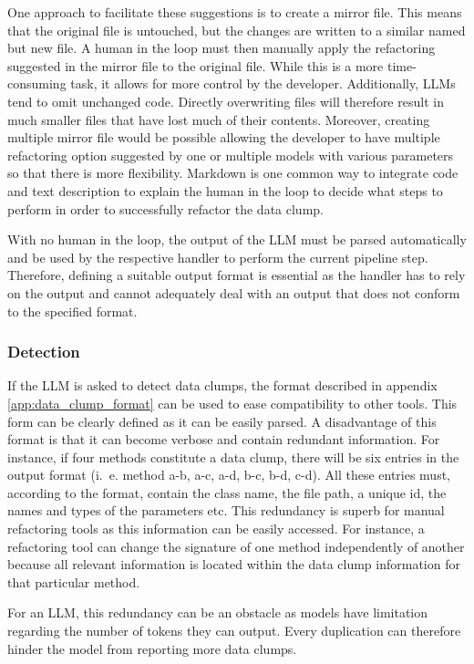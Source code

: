 One approach to facilitate these suggestions is to create a mirror file. This means that the original file is untouched, but the changes are written to a similar named but new file. A human in the loop must then manually apply the refactoring suggested in the mirror file to the original file. While this is a more time-consuming task, it allows for more control by the developer. Additionally, \acp{LLM} tend to omit unchanged code. Directly overwriting files will therefore result in much smaller files that have lost much of their contents. Moreover, creating multiple mirror file would be possible allowing the developer to have multiple refactoring option suggested by one or multiple models with various parameters so that there is more flexibility. 
Markdown is one common way to integrate code and text description to explain the human in the loop to decide what steps to perform in order to successfully refactor the data clump.  

\bigskip

With no human in the loop, the output of the \ac{LLM} must be parsed automatically and be used by the respective handler to perform the current pipeline step. Therefore, defining a suitable output  format  is essential as the handler has to rely on the output and cannot adequately deal with an output that does not conform to the specified format. 
\subsubsection{Detection}
If the \ac{LLM} is asked to detect data clumps, the format described in appendix \ref{app:data_clump_format} can be used to ease compatibility to other tools. This form can be clearly defined as it can be easily parsed. A disadvantage of this format is that it can become verbose and contain redundant information. For instance, if four methods  constitute a data clump, there will be six entries in the output format (i.~e. method a-b, a-c, a-d, b-c, b-d, c-d). All these entries must, according to the format, contain the class name, the file path, a unique id, the names and types of the parameters etc. This redundancy is superb for manual refactoring tools as this information can be easily accessed. For instance, a refactoring tool can change the signature of one method independently of another because all relevant information is located within the data clump information for that particular method. 

For an \ac{LLM}, this redundancy can be an obstacle as models have limitation regarding the number of tokens they can output. Every duplication can therefore hinder the model from reporting more data clumps.



